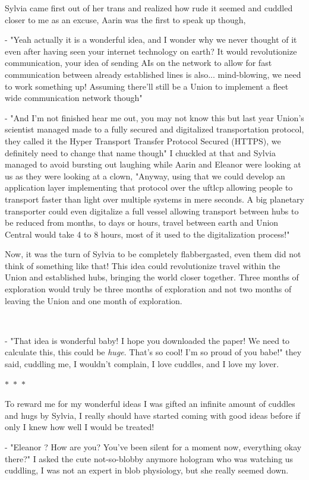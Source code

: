 \documentclass[colorlinks,12pt,a4paper]{book}
\newcommand\sep{\begin{center}
  \boldmath $\ast$~$\ast$~$\ast$
\end{center}}
\begin{document}
 Sylvia came first out of her trans and realized how rude it seemed and cuddled closer to me as an excuse, Aarin was the first to speak up 
 though,\par 
 - "Yeah actually it is a wonderful idea, and I wonder why we never thought of it even after having seen your internet technology on earth? It 
 would revolutionize communication, your idea of sending AIs on the network to allow for fast communication between already established lines 
 is also... mind-blowing, we need to work something up! Assuming there'll still be a Union to implement a fleet wide communication network though"\par 
 \bigskip 
 
 - "And I'm not finished hear me out, you may not know this but last year Union's scientist managed made to a fully secured and digitalized transportation protocol,
 they called it the Hyper Transport Transfer Protocol Secured (HTTPS), we definitely need to change that name though" I chuckled at that and Sylvia managed to avoid 
 bursting out laughing while Aarin and Eleanor were looking at us as they were looking at a clown, "Anyway, using that we could develop 
 an application layer implementing that protocol over the \gls{uftlcp} allowing people to transport faster than light over multiple systems 
 in mere seconds. A big planetary transporter could even digitalize a full vessel allowing transport between hubs to be reduced from months, to days or hours,
 travel between earth and Union Central would take 4 to 8 hours, most of it used to the digitalization process!"\par 
 \bigskip 
 
 Now, it was the turn of Sylvia to be completely flabbergasted, even them did not think of something like that! This idea could revolutionize 
 travel within the Union and established hubs, bringing the world closer together. Three months of exploration would truly be three months of exploration 
 and not two months of leaving the Union and one month of exploration.\par \
 \bigskip 
 
 - "That idea is wonderful baby! I hope you downloaded the paper! We need to calculate this, this could be \textit{huge}. That's so cool! I'm so 
 proud of you babe!" they said, cuddling me, I wouldn't complain, I love cuddles, and I love my lover.
 
 \sep 
 
 To reward me for my wonderful ideas I was gifted an infinite amount of cuddles and hugs by Sylvia, I really should have started coming with good 
 ideas before if only I knew how well I would be treated!\par 
 - "Eleanor ? How are you? You've been silent for a moment now, everything okay there?" I asked the cute not-so-blobby anymore hologram who was 
 watching us cuddling, I was not an expert in blob physiology, but she really seemed down.\par 
 \bigskip 
 
\end{document}
